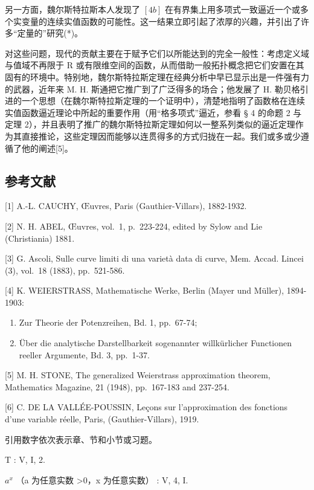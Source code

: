另一方面，魏尔斯特拉斯本人发现了 \([4b]\) 在有界集上用多项式一致逼近一个或多个实变量的连续实值函数的可能性。这一结果立即引起了浓厚的兴趣，并引出了许多“定量的”研究(*)。

对这些问题，现代的贡献主要在于赋予它们以所能达到的完全一般性：考虑定义域与值域不再限于 R 或有限维空间的函数，从而借助一般拓扑概念把它们安置在其固有的环境中。特别地，魏尔斯特拉斯定理在经典分析中早已显示出是一件强有力的武器，近年来 M. H. 斯通把它推广到了广泛得多的场合；他发展了 H. 勒贝格引进的一个思想（在魏尔斯特拉斯定理的一个证明中），清楚地指明了函数格在连续实值函数逼近理论中所起的重要作用（用“格多项式”逼近，参看 § 4 的命题 2 与定理 2），并且表明了推广的魏尔斯特拉斯定理如何以一整系列类似的逼近定理作为其直接推论，这些定理因而能够以连贯得多的方式归拢在一起。我们或多或少遵循了他的阐述{[}5{]}。

\subsection*{参考文献}

{[}1{]} A.-L. CAUCHY, Œuvres, Paris (Gauthier-Villars), 1882-1932.

{[}2{]} N. H. ABEL, Œuvres, vol.~1, p.~223-224, edited by Sylow and Lie (Christiania) 1881.

{[}3{]} G. Ascoli, Sulle curve limiti di una varietà data di curve, Mem. Accad. Lincei (3), vol.~18 (1883), pp.~521-586.

{[}4{]} K. WEIERSTRASS, Mathematische Werke, Berlin (Mayer und Müller), 1894-1903:

\begin{enumerate}
\def\labelenumi{\alph{enumi})}
\item
  Zur Theorie der Potenzreihen, Bd. 1, pp.~67-74;
\item
  Über die analytische Darstellbarkeit sogenannter willkürlicher Functionen reeller Argumente, Bd. 3, pp.~1-37.
\end{enumerate}

{[}5{]} M. H. STONE, The generalized Weierstrass approximation theorem, Mathematics Magazine, 21 (1948), pp.~167-183 and 237-254.

{[}6{]} C. DE LA VALLÉE-POUSSIN, Leçons sur l'approximation des fonctions d'une variable réelle, Paris, (Gauthier-Villars), 1919.

引用数字依次表示章、节和小节或习题。

T : V, I, 2.

\(a^{x}\) （a 为任意实数 \textgreater0，x 为任意实数） : V, 4, I.


